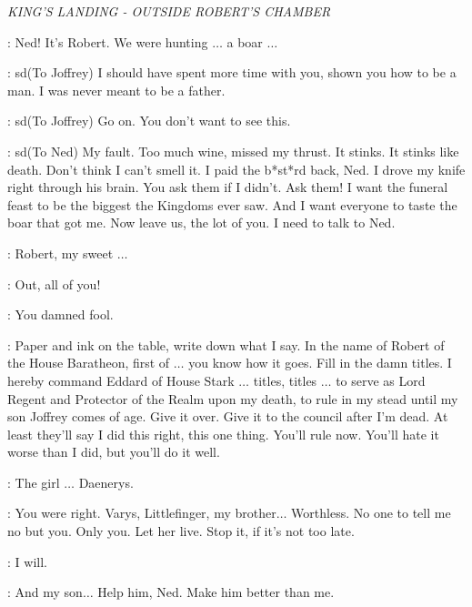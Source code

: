 \scene

\textit{KING'S LANDING - OUTSIDE ROBERT'S CHAMBER} 


\RENLY: Ned! It's Robert. We were hunting $\ldots$ a boar $\ldots$  


\ROBERT: sd{(To Joffrey)} I should have spent more time with you, shown you how to be a man. I was never meant to be a father.


\ROBERT: sd{(To Joffrey)} Go on.  You don't want to see this.


\ROBERT: sd{(To Ned)} My fault. Too much wine, missed my thrust. It stinks.  It stinks like death. Don't think I can't smell it. I paid the b*st*rd back, Ned. I drove my knife right through his brain. You ask them if I didn't. Ask them! I want the funeral feast to be the biggest the Kingdoms ever saw. And I want everyone to taste the boar that got me. Now leave us, the lot of you. I need to talk to Ned. 

\CERSEI: Robert, my sweet $\ldots$  

\ROBERT: Out, all of you! 


\NED: You damned fool. 

\ROBERT: Paper and ink on the table, write down what I say.  In the name of Robert of the House Baratheon, first of $\ldots$  you know how it goes.  Fill in the damn titles.  I hereby command Eddard of House Stark $\ldots$  titles, titles $\ldots$ to serve as Lord Regent and Protector of the Realm upon my death, to rule in my stead until my son Joffrey comes of age.  Give it over.  Give it to the council after I'm dead.  At least they'll say I did this right, this one thing.  You'll rule now. You'll hate it worse than I did, but you'll do it well. 

\NED: The girl $\ldots$ Daenerys. 

\ROBERT: You were right. Varys, Littlefinger, my brother$\ldots$ Worthless.  No one to tell me no but you.  Only you.  Let her live.  Stop it, if it's not too late. 

\NED: I will. 

\ROBERT: And my son$\ldots$  Help him, Ned.  Make him better than me. 

